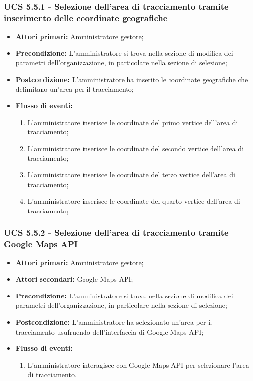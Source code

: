 \subsubsection{UCS 5.5.1 - Selezione dell'area di tracciamento tramite inserimento delle coordinate geografiche}%
\begin{itemize}
\item \textbf{Attori primari:} Amministratore gestore;
\item \textbf{Precondizione:} L'amministratore si trova nella sezione di modifica dei parametri dell'organizzazione, in particolare nella sezione di selezione;
\item \textbf{Postcondizione:} L'amministratore ha inserito le coordinate geografiche che delimitano un'area per il tracciamento;
\item \textbf{Flusso di eventi:}
\begin{enumerate}
    \item L'amministratore inserisce le coordinate del primo vertice dell'area di tracciamento;
    \item L'amministratore inserisce le coordinate del secondo vertice dell'area di tracciamento;
    \item L'amministratore inserisce le coordinate del terzo vertice dell'area di tracciamento;
    \item L'amministratore inserisce le coordinate del quarto vertice dell'area di tracciamento;
\end{enumerate}
\end{itemize}

\subsubsection{UCS 5.5.2 - Selezione dell'area di tracciamento tramite Google Maps API}%
\begin{itemize}
\item \textbf{Attori primari:} Amministratore gestore;
\item \textbf{Attori secondari:} Google Maps API;
\item \textbf{Precondizione:} L'amministratore si trova nella sezione di modifica dei parametri dell'organizzazione, in particolare nella sezione di selezione;
\item \textbf{Postcondizione:} L'amministratore ha selezionato un'area per il tracciamento usufruendo dell'interfaccia di Google Maps API;
\item \textbf{Flusso di eventi:}
\begin{enumerate}
    \item L'amministratore interagisce con Google Maps API per selezionare l'area di tracciamento.
\end{enumerate}
\end{itemize}